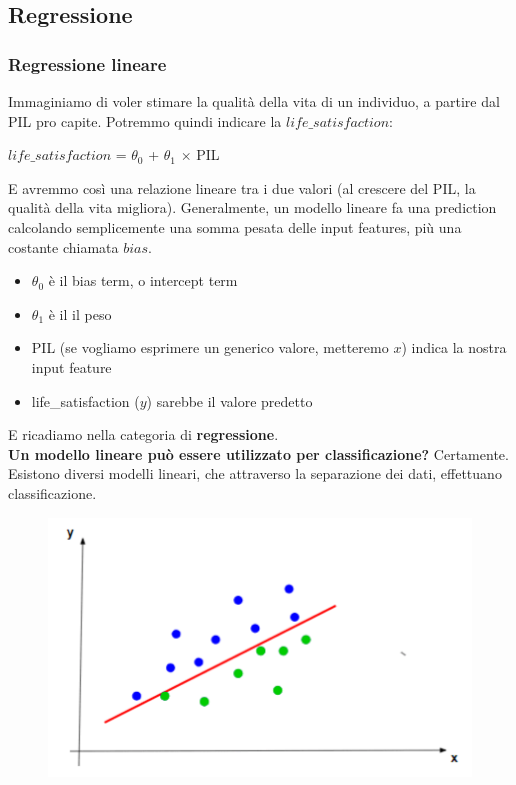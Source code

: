 \newpage

\subsection{Regressione}
\subsubsection{Regressione lineare}
Immaginiamo di voler stimare la qualità della vita di un individuo, a partire dal PIL pro capite. Potremmo quindi indicare la $life\_satisfaction$:
\begin{center}
    $life\_satisfaction$ = $\theta_0$ + $\theta_1$ $\times$ PIL
\end{center}
E avremmo così una relazione lineare tra i due valori (al crescere del PIL, la qualità della vita migliora). Generalmente, un modello lineare fa una prediction calcolando semplicemente una somma pesata delle input features, più una costante chiamata $bias$. 
\begin{itemize}
    \item $\theta_0$ è il bias term, o intercept term
    \item $\theta_1$ è il il peso
    \item PIL (se vogliamo esprimere un generico valore, metteremo $x$) indica la nostra input feature
    \item life\_satisfaction ($y$) sarebbe il valore predetto
\end{itemize}
E ricadiamo nella categoria di \textbf{regressione}.
\\
\textbf{Un modello lineare può essere utilizzato per classificazione?} Certamente. Esistono diversi modelli lineari, che attraverso la separazione dei dati, effettuano classificazione.  
\\
\begin{figure}[th]
    \centering
    \includegraphics[scale=0.25]{ML/img/class lineare.png}
    \label{fig:linclass}
\end{figure}

